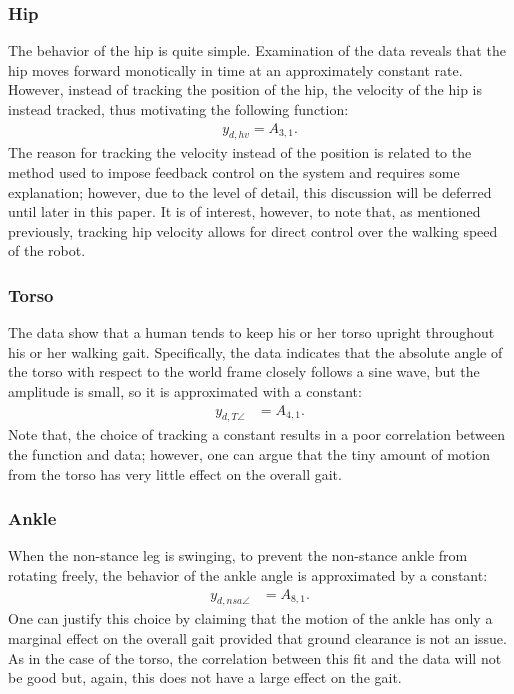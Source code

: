 \subsubsection{Hip} The behavior of the hip is quite simple. Examination of the data reveals that the hip moves forward monotically in time at an approximately constant rate. However, instead of tracking the position of the hip, the velocity of the hip is instead tracked, thus motivating the following function:
\begin{align}
  y_{d,hv} = A_{3,1}.
\end{align}
The reason for tracking the velocity instead of the position is related to the method used to impose feedback control on the system and requires some explanation; however, due to the level of detail, this discussion will be deferred until later in this paper. It is of interest, however, to note that, as mentioned previously, tracking hip velocity allows for direct control over the walking speed of the robot.

\subsubsection{Torso} The data show that a human tends to keep his or her torso upright throughout his or her walking gait. Specifically, the data indicates that the absolute angle of the torso with respect to the world frame closely follows a sine wave, but the amplitude is small, so it is approximated with a constant:
\begin{align}
  y_{d,T\angle} &= A_{4,1}.
\end{align}
Note that, the choice of tracking a constant results in a poor correlation between the function and data; however, one can argue that the tiny amount of motion from the torso has very little effect on the overall gait.

\subsubsection{Ankle} When the non-stance leg is swinging, to prevent the non-stance ankle from rotating freely, the behavior of the ankle angle is approximated by a constant:
\begin{align}
  y_{d,nsa\angle} &= A_{8,1}.
\end{align}
One can justify this choice by claiming that the motion of the ankle has only a marginal effect on the overall gait provided that ground clearance is not an issue. As in the case of the torso, the correlation between this fit and the data will not be good but, again, this does not have a large effect on the gait.

